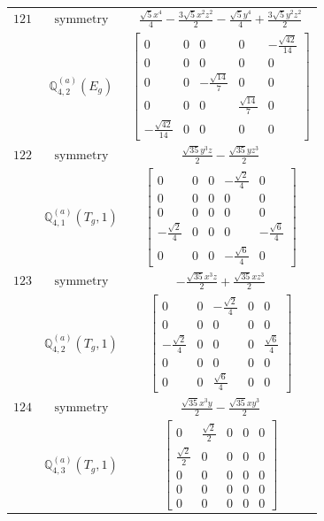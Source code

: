 \documentclass[fleqn,8pt,landscape]{jsarticle}
\begin{document}
\begin{longtable}{ccc}
$ 121 $ & $ \text{symmetry} $ & $ \frac{\sqrt{5} x^{4}}{4} - \frac{3 \sqrt{5} x^{2} z^{2}}{2} - \frac{\sqrt{5} y^{4}}{4} + \frac{3 \sqrt{5} y^{2} z^{2}}{2} $ \\
$  $ & $ \mathbb{Q}_{4,2}^{(a)}(E_{g}) $ & $ \begin{bmatrix} 0 & 0 & 0 & 0 & - \frac{\sqrt{42}}{14} \\ 0 & 0 & 0 & 0 & 0 \\ 0 & 0 & - \frac{\sqrt{14}}{7} & 0 & 0 \\ 0 & 0 & 0 & \frac{\sqrt{14}}{7} & 0 \\ - \frac{\sqrt{42}}{14} & 0 & 0 & 0 & 0 \end{bmatrix} $ \\ \hline
$ 122 $ & $ \text{symmetry} $ & $ \frac{\sqrt{35} y^{3} z}{2} - \frac{\sqrt{35} y z^{3}}{2} $ \\
$  $ & $ \mathbb{Q}_{4,1}^{(a)}(T_{g},1) $ & $ \begin{bmatrix} 0 & 0 & 0 & - \frac{\sqrt{2}}{4} & 0 \\ 0 & 0 & 0 & 0 & 0 \\ 0 & 0 & 0 & 0 & 0 \\ - \frac{\sqrt{2}}{4} & 0 & 0 & 0 & - \frac{\sqrt{6}}{4} \\ 0 & 0 & 0 & - \frac{\sqrt{6}}{4} & 0 \end{bmatrix} $ \\ \hline
$ 123 $ & $ \text{symmetry} $ & $ - \frac{\sqrt{35} x^{3} z}{2} + \frac{\sqrt{35} x z^{3}}{2} $ \\
$  $ & $ \mathbb{Q}_{4,2}^{(a)}(T_{g},1) $ & $ \begin{bmatrix} 0 & 0 & - \frac{\sqrt{2}}{4} & 0 & 0 \\ 0 & 0 & 0 & 0 & 0 \\ - \frac{\sqrt{2}}{4} & 0 & 0 & 0 & \frac{\sqrt{6}}{4} \\ 0 & 0 & 0 & 0 & 0 \\ 0 & 0 & \frac{\sqrt{6}}{4} & 0 & 0 \end{bmatrix} $ \\ \hline
$ 124 $ & $ \text{symmetry} $ & $ \frac{\sqrt{35} x^{3} y}{2} - \frac{\sqrt{35} x y^{3}}{2} $ \\
$  $ & $ \mathbb{Q}_{4,3}^{(a)}(T_{g},1) $ & $ \begin{bmatrix} 0 & \frac{\sqrt{2}}{2} & 0 & 0 & 0 \\ \frac{\sqrt{2}}{2} & 0 & 0 & 0 & 0 \\ 0 & 0 & 0 & 0 & 0 \\ 0 & 0 & 0 & 0 & 0 \\ 0 & 0 & 0 & 0 & 0 \end{bmatrix} $ \\ \hline

\end{longtable}
\end{document}
